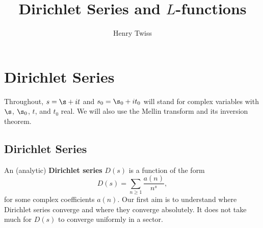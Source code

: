 \documentclass[12pt]{article}
\title{Dirichlet Series and \texorpdfstring{\(L\)}{L}-functions}
\author{Henry Twiss}
\begin{document}
  \date{}
  \maketitle
  \tableofcontents
  \section{Dirichlet Series}
    Throughout, \(s = \s+it\) and \(s_{0} = \s_{0}+it_{0}\) will stand for complex variables with \(\s\), \(\s_{0}\), \(t\), and \(t_{0}\) real. We will also use the Mellin transform and its inversion theorem.
    \subsection{Dirichlet Series}
      An (analytic) \textbf{Dirichlet series} \(D(s)\) is a function of the form
      \[
        D(s) = \sum_{n \ge 1}\frac{a(n)}{n^{s}},
      \]
      for some complex coefficients \(a(n)\). Our first aim is to understand where Dirichlet series converge and where they converge absolutely. It does not take much for \(D(s)\) to converge uniformly in a sector.
\end{document}
